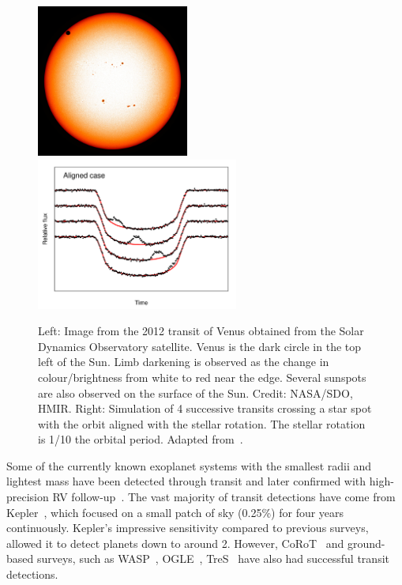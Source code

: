 \begin{figure}
    \centering
    \includegraphics[height=5cm]{./figures/introduction/SDO_2012_Venus_Transit.jpg}
    \includegraphics[height=5cm]{figures/introduction/sanchisojedafig1-crop.pdf}
    \caption[Transit of Venus and successive transit corssings.]{Left: Image from the 2012 transit of Venus obtained from the Solar Dynamics Observatory satellite.
    Venus is the dark circle in the top left of the Sun.
    Limb darkening is observed as the change in colour/brightness from white to red near the edge.
    Several sunspots are also observed on the surface of the Sun.
    Credit: {NASA}/{SDO}, {HMIR}.
    Right: Simulation of 4 successive transits crossing a star spot with the orbit aligned with the stellar rotation.
    The stellar rotation is 1/10 the orbital period.
    Adapted from~\citet[][Figure~1]{sanchis-ojeda_starspots_2013}.}
    \label{fig:transit_venus_transit_alignment}
\end{figure}


Some of the currently known exoplanet systems with the smallest radii and lightest mass have been detected through transit and later confirmed with high-precision {RV} follow-up~\citep[e.g.][]{queloz_corot7_2009, pepe_earthsized_2013, lopez-morales_kepler21b_2016, ment_second_2018}.
The vast majority of transit detections have come from Kepler~\citep{borucki_characteristics_2011}, which focused on a small patch of sky (0.25\%) for four years continuously.
Kepler's impressive sensitivity compared to previous surveys, allowed it to detect planets down to around 2\Rearth{}.
However, {CoRoT}~\citep{barge_transiting_2008} and ground-based surveys, such as WASP~\citep{pollacco_wasp_2006}, OGLE~\citep{udalski_optical_2002}, TreS~\citep{alonso_tres1_2004} have also had successful transit detections.

